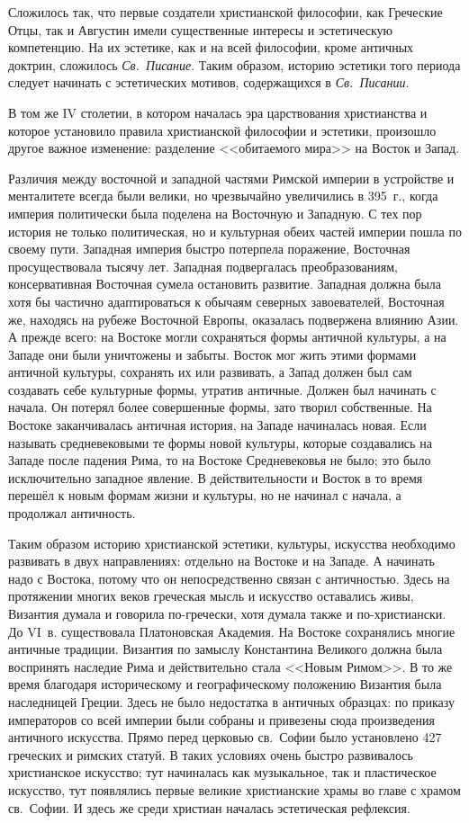 Сложилось так, что первые создатели христианской философии, как Греческие Отцы, так и Августин имели существенные интересы и эстетическую компетенцию. На их эстетике, как и на всей философии, кроме античных доктрин, сложилось \emph{Св.~Писание}. Таким образом, историю эстетики того периода следует начинать с эстетических мотивов, содержащихся в \emph{Св.~Писании}.

В том же IV столетии, в котором началась эра царствования христианства и которое установило правила христианской философии и эстетики, произошло другое важное изменение: разделение <<обитаемого мира>> на Восток и Запад.

Различия между восточной и западной частями Римской империи в устройстве и менталитете всегда были велики, но чрезвычайно увеличились в 395~г., когда империя политически была поделена на Восточную и Западную. С тех пор история не только политическая, но и культурная обеих частей империи пошла по своему пути. Западная империя быстро потерпела поражение, Восточная просуществовала тысячу лет. Западная подвергалась преобразованиям, консервативная Восточная сумела остановить развитие. Западная должна была хотя бы частично адаптироваться к обычаям северных завоевателей, Восточная же, находясь на рубеже Восточной Европы, оказалась подвержена влиянию Азии. А прежде всего: на Востоке могли сохраняться формы античной культуры, а на Западе они были уничтожены и забыты. Восток мог жить этими формами античной культуры, сохранять их или развивать, а Запад должен был сам создавать себе культурные формы, утратив античные. Должен был начинать с начала. Он потерял более совершенные формы, зато творил собственные. На Востоке заканчивалась античная история, на Западе начиналась новая. Если называть средневековыми те формы новой культуры, которые создавались на Западе после падения Рима, то на Востоке Средневековья не было; это было исключительно западное явление. В действительности и Восток в то время перешёл к новым формам жизни и культуры, но не начинал с начала, а продолжал античность.

Таким образом историю христианской эстетики, культуры, искусства необходимо развивать в двух направлениях: отдельно на Востоке и на Западе. А начинать надо с Востока, потому что он непосредственно связан с античностью. Здесь на протяжении многих веков греческая мысль и искусство оставались живы, Византия думала и говорила по-гречески, хотя думала также и по-христиански. До VI~в. существовала Платоновская Академия. На Востоке сохранялись многие античные традиции. Византия по замыслу Константина Великого должна была воспринять наследие Рима и действительно стала <<Новым Римом>>. В то же время благодаря историческому и географическому положению Византия была наследницей Греции. Здесь не было недостатка в античных образцах: по приказу императоров со всей империи были собраны и привезены сюда произведения античного искусства. Прямо перед церковью св.~Софии было установлено 427 греческих и римских статуй. В таких условиях очень быстро развивалось христианское искусство; тут начиналась как музыкальное, так и пластическое искусство, тут появлялись первые великие христианские храмы во главе с храмом св.~Софии. И здесь же среди христиан началась эстетическая рефлексия.